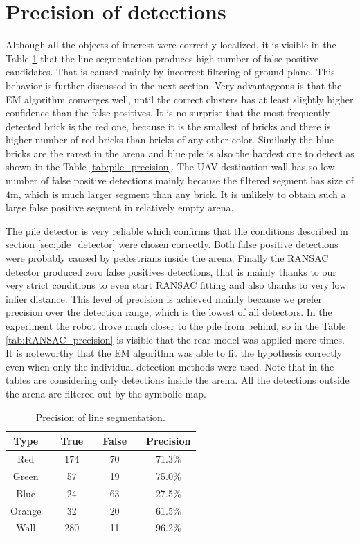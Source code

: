 \section{Precision of detections}
Although all the objects of interest were correctly localized, it is visible in the Table \ref{tab:seg_precision} that the line segmentation produces high number of false positive candidates. That is caused mainly by incorrect filtering of ground plane. This behavior is further discussed in the next section. Very advantageous is that the EM algorithm converges well, until the correct clusters has at least slightly higher confidence than the false positives. It is no surprise that the most frequently detected brick is the red one, because it is the smallest of bricks and there is higher number of red bricks than bricks of any other color. Similarly the blue bricks are the rarest in the arena and blue pile is also the hardest one to detect as shown in the Table \ref{tab:pile_precision}. The UAV destination wall has so low number of false positive detections mainly because the filtered segment has size of $4$m, which is much larger segment than any brick. It is unlikely to obtain such a large false positive segment in relatively empty arena.

The pile detector is very reliable which confirms that the conditions described in section \ref{sec:pile_detector} were chosen correctly. Both false positive detections were probably caused by pedestrians inside the arena. Finally the RANSAC detector produced zero false positives detections, that is mainly thanks to our very strict conditions to even start RANSAC fitting and also thanks to very low inlier distance. This level of precision is achieved mainly because we prefer precision over the detection range, which is the lowest of all detectors. In the experiment the robot drove much closer to the pile from behind, so in the Table \ref{tab:RANSAC_precision} is visible that the rear model was applied more times. It is noteworthy that the EM algorithm was able to fit the hypothesis correctly even when only the individual detection methods were used. Note that in the tables are considering only detections inside the arena. All the detections outside the arena are filtered out by the symbolic map.

\begin{table}[H]
	\centering
	\caption{Precision of line segmentation.}
	\begin{tabular}{ccccccc}
		\toprule
		Type &\quad& True &\quad& False &\quad& Precision \\
		\midrule
		Red &\quad& 174 &\quad& 70 &\quad&71.3\% \\
		Green &\quad& 57 &\quad& 19 &\quad& 75.0\% \\
		Blue &\quad& 24 &\quad& 63 &\quad& 27.5\% \\
		Orange &\quad& 32 &\quad& 20 &\quad& 61.5\% \\
		Wall &\quad& 280 &\quad& 11 &\quad& 96.2\% \\
		\bottomrule
	\end{tabular}
	\label{tab:seg_precision}
\end{table}


